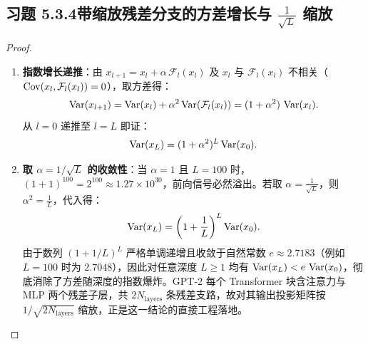 \subsection*{习题 5.3.4\quad 带缩放残差分支的方差增长与 $\frac{1}{\sqrt{L}}$ 缩放}
\begin{proof}
\begin{enumerate}[label=(\alph*), leftmargin=1.8em]
  \item \textbf{指数增长递推}：由 $x_{l+1} = x_l + \alpha\,\mathcal{F}_l(x_l)$ 及 $x_l$ 与 $\mathcal{F}_l(x_l)$ 不相关（$\operatorname{Cov}(x_l, \mathcal{F}_l(x_l)) = 0$），取方差得：
  \[
    \operatorname{Var}(x_{l+1}) = \operatorname{Var}(x_l) + \alpha^2 \operatorname{Var}(\mathcal{F}_l(x_l))
    = (1 + \alpha^2)\,\operatorname{Var}(x_l).
  \]
  从 $l = 0$ 递推至 $l = L$ 即证：
  \[
    \operatorname{Var}(x_L) = (1 + \alpha^2)^L \operatorname{Var}(x_0).
  \]

  \item \textbf{取 $\alpha = 1/\sqrt{L}$ 的收敛性}：当 $\alpha = 1$ 且 $L = 100$ 时，$(1 + 1)^{100} = 2^{100} \approx 1.27 \times 10^{30}$，前向信号必然溢出。若取 $\alpha = \frac{1}{\sqrt{L}}$，则 $\alpha^2 = \frac{1}{L}$，代入得：
  \[
    \operatorname{Var}(x_L) = \left(1 + \frac{1}{L}\right)^L \operatorname{Var}(x_0).
  \]
  由于数列 $(1 + 1/L)^L$ 严格单调递增且收敛于自然常数 $e \approx 2.7183$（例如 $L=100$ 时为 $2.7048$），因此对任意深度 $L \ge 1$ 均有 $\operatorname{Var}(x_L) < e\,\operatorname{Var}(x_0)$，彻底消除了方差随深度的指数爆炸。GPT-2 每个 Transformer 块含注意力与 MLP 两个残差子层，共 $2 N_{\text{layers}}$ 条残差支路，故对其输出投影矩阵按 $1/\sqrt{2 N_{\text{layers}}}$ 缩放，正是这一结论的直接工程落地。
\end{enumerate}
\end{proof}

